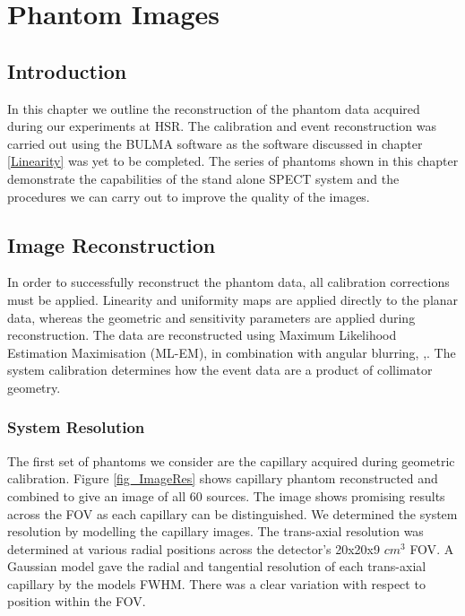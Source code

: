 \chapter{Phantom Images}
\label{IEEE}


\section{Introduction}
In this chapter we outline the reconstruction of the phantom data acquired during our experiments at \acrshort{HSR}. The calibration and event reconstruction was carried out using the BULMA software as the software discussed in chapter \ref{Linearity} was yet to be completed. The series of phantoms shown in this chapter demonstrate the capabilities of the stand alone \acrshort{SPECT} system and the procedures we can carry out to improve the quality of the images. 


\section{Image Reconstruction}
In order to successfully reconstruct the phantom data, all calibration corrections must be applied. Linearity and uniformity maps are applied directly to the planar data, whereas the geometric and sensitivity parameters are applied during reconstruction. The data are reconstructed using Maximum Likelihood Estimation Maximisation (ML-EM), \cite{4307558} in combination with angular blurring, \cite{bousse2013angular},\cite{8069508}. The system calibration determines how the event data are a product of collimator geometry.

\subsection{System Resolution}
The first set of phantoms we consider are the capillary acquired during geometric calibration. Figure \ref{fig_ImageRes} shows capillary phantom reconstructed and combined to give an image of all 60 sources. The image shows promising results across the \acrshort{FOV} as each capillary can be distinguished. We determined the system resolution by modelling the capillary images. The trans-axial resolution was determined at various radial positions across the detector's 20x20x9 $cm^3$ \acrshort{FOV}. A Gaussian model gave the radial and tangential resolution of each trans-axial capillary by the models \acrshort{FWHM}. There was a clear variation with respect to position within the \acrshort{FOV}.

